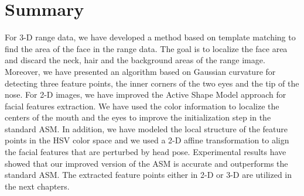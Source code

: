 \section{Summary}
For 3-D range data, we have developed a method based on template
matching to find the area of the face in the range data. The goal is
to localize the face area and discard the neck, hair and the
background areas of the range image. Moreover, we have presented an
algorithm based on Gaussian curvature for detecting three feature
points, the inner corners of the two eyes and the tip of the nose.
For 2-D images, we have improved the Active Shape Model approach for
facial features extraction. We have used the color information to
localize the centers of the mouth and the eyes to improve the
initialization step in the standard ASM. In addition, we have
modeled the local structure of the feature points in the HSV color
space and we used a 2-D affine transformation to align the facial
features that are perturbed by head pose. Experimental results have
showed that our improved version of the ASM is accurate and
outperforms the standard ASM. The extracted feature points either in
2-D or 3-D are utilized in the next chapters.
